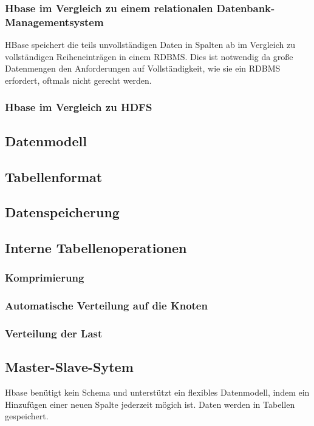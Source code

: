 \subsubsection{Hbase im Vergleich zu einem relationalen Datenbank-Managementsystem}
HBase speichert die teils unvollständigen Daten in Spalten ab im Vergleich zu vollständigen Reiheneinträgen in einem RDBMS. Dies ist notwendig da große Datenmengen den Anforderungen auf Vollständigkeit, wie sie ein RDBMS erfordert, oftmals nicht gerecht werden.  
\subsubsection{Hbase im Vergleich zu HDFS}



\subsection{Datenmodell}

\subsection{Tabellenformat}
\subsection{Datenspeicherung}
\subsection{Interne Tabellenoperationen}
\subsubsection{Komprimierung}
\subsubsection{Automatische Verteilung auf die Knoten}
\subsubsection{Verteilung der Last}

\subsection{Master-Slave-Sytem}

Hbase benütigt kein Schema und unterstützt ein flexibles Datenmodell, indem ein Hinzufügen einer neuen Spalte jederzeit mögich ist. Daten werden in Tabellen gespeichert.

